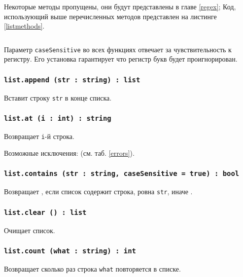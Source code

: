 Некоторые методы пропущены, они будут представлены в главе \ref{regex}; Код, использующий выше перечисленных методов представлен на листинге \ref{listmethods}. 

\begin{sourcecode}
	\label{listmethods}
    \inputminted[linenos]{icl}{../sources/listprop.icL}
\end{sourcecode}

Параметр \texttt{caseSensitive} во всех функциях отвечает за чувствительность к регистру. Его установка гарантирует что регистр букв будет проигнорирован.

\subsubsection{\texttt{list.append (str : string) : list}}

Вставит строку \texttt{str} в конце списка.

\subsubsection{\texttt{list.at (i : int) : string}}

Возвращает \texttt{i}-й строка.

Возможные исключения:  (см. таб. \ref{errors}).

\subsubsection{\texttt{list.contains (str : string, caseSensitive = true) : bool}}

Возвращает \true, если список содержит строка, ровна \texttt{str}, иначе \false.

\subsubsection{\texttt{list.clear () : list}}

Очищает список.

\subsubsection{\texttt{list.count (what : string) : int}}

Возвращает сколько раз строка \texttt{what} повторяется в списке.

